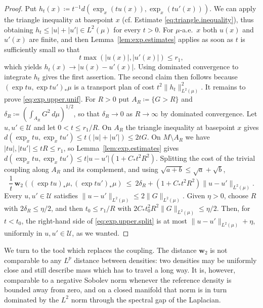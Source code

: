 \documentclass[11pt,reqno]{amsart}
\theoremstyle{plain}
\theoremstyle{definition}
\newcommand{\dw}{\mathbf{w}_2}
\begin{document}
\begin{proof}
    Put \( h_t(x)\coloneqq t^{-1}d\left(\exp_x(tu(x)),\exp_x(tu'(x))\right) \).
    We can apply the triangle inequality at basepoint \(x\) (cf. Estimate \eqref{eq:triangle.inequality}), thus obtaining \( h_t\le\lvert u\rvert+\lvert u'\rvert\in L^2(\mu) \) for every \( t>0 \).
    For \( \mu \)-a.e.\ \( x \) both \( u(x) \) and \( u'(x) \) are finite, and then Lemma~\ref{lem:exp.estimates} applies as soon as \(t\) is sufficiently small so that 
    \[
        t\max(\lvert u(x)\rvert,\lvert u'(x)\rvert)\le r_1,
    \]
    which yields \( h_t(x)\to\lvert u(x)-u'(x)\rvert \).  
    Using dominated convergence to integrate \(h_t\) gives the first assertion.
    The second claim then follows because \( (\exp tu,\exp tu')_\ast\mu \) is a transport plan of cost \( t^2\lVert h_t\rVert_{L^2(\mu)}^2 \).
    It remains to prove \eqref{eq:exp.upper.unif}.
    For \( R>0 \) put \( A_R\coloneqq\{G>R\} \) and \( \delta_R\coloneqq\left(\int_{A_R}G^2\,d\mu\right)^{1/2} \), so that \( \delta_R\to0 \) as \( R\to\infty \) by dominated convergence.
    Let \( u,u'\in\mathcal U \) and let \( 0<t\le r_1/R \).
    On \( A_R \) the triangle inequality at basepoint \( x \) gives \( d(\exp_xtu,\exp_xtu')\le t(\lvert u\rvert+\lvert u'\rvert)\le2tG \).
    On \( M\setminus A_R \) we have \( \lvert tu\rvert,\lvert tu'\rvert\le tR\le r_1 \), so Lemma~\ref{lem:exp.estimates} gives \( d(\exp_xtu,\exp_xtu')\le t\lvert u-u'\rvert\left(1+C_\ast t^2R^2\right) \).
    Splitting the cost of the trivial coupling along \( A_R \) and its complement, and using \( \sqrt{a+b}\le\sqrt a+\sqrt b \),
    \begin{equation}\label{eq:exp.upper.split}
        \frac1t\,\dw\left((\exp tu)_\ast\mu,(\exp tu')_\ast\mu\right)\ \le\ 2\delta_R+\left(1+C_\ast t^2R^2\right)\lVert u-u'\rVert_{L^2(\mu)} .
    \end{equation}
    Every \( u,u'\in\mathcal U \) satisfies \( \lVert u-u'\rVert_{L^2(\mu)}\le2\lVert G\rVert_{L^2(\mu)} \).
    Given \( \eta>0 \), choose \( R \) with \( 2\delta_R\le\eta/2 \), and then \( t_0\le r_1/R \) with \( 2C_\ast t_0^2R^2\lVert G\rVert_{L^2(\mu)}\le\eta/2 \).
    Then, for \( t<t_0 \), the right-hand side of \eqref{eq:exp.upper.split} is at most \( \lVert u-u'\rVert_{L^2(\mu)}+\eta \), uniformly in \( u,u'\in\mathcal U \), as we wanted.

\end{proof}

We turn to the tool which replaces the coupling.
The distance \( \dw \) is not comparable to any \( L^p \) distance between densities: two densities may be uniformly close and still describe mass which has to travel a long way.
It is, however, comparable to a negative Sobolev norm whenever the reference density is bounded away from zero, and on a closed manifold that norm is in turn dominated by the \( L^2 \) norm through the spectral gap of the Laplacian.
\end{document}
